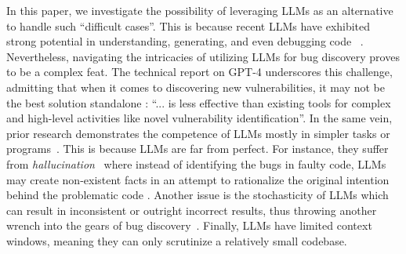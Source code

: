 In this paper, we investigate the possibility of leveraging \acfp{LLM} 
as an alternative to handle such ``difficult cases''. This is because recent LLMs have exhibited strong potential in understanding, generating, and even debugging code ~\cite{github_github_nodate, langchain_2023_announcing_2023, codex}. 
Nevertheless, navigating the intricacies of utilizing LLMs for bug discovery proves to be a complex feat.
The technical report on GPT-4 underscores this challenge, admitting that when it comes to discovering new vulnerabilities, it may not be the best solution standalone \cite{openai_2023_gpt_4}: ``... is less effective than existing tools for complex and high-level activities like
novel vulnerability identification''.
In the same vein, prior research demonstrates the competence of LLMs mostly in simpler tasks or programs~\cite{pei_can_2023, ahmed_improving_2023, pearce_examining_2023}.
This is because LLMs are far from perfect. For instance, they suffer from \textit{hallucination}~\cite{ji_survey_2023} where instead of identifying the bugs in faulty code, LLMs may create non-existent facts in an attempt to rationalize the original intention behind the problematic code \cite{ma_scope_2023, tian_is_2023}. 
Another issue is the stochasticity of LLMs which can result in inconsistent or outright incorrect results, thus throwing another wrench into the gears of bug discovery~\cite{zhao2023survey}. Finally, LLMs have limited context windows, meaning they can only scrutinize a relatively small codebase.

